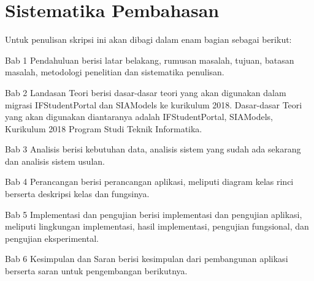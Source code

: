 \section{Sistematika Pembahasan}
\label{sec:sispem}
Untuk penulisan skripsi ini akan dibagi dalam enam bagian sebagai berikut:

Bab 1 Pendahuluan berisi latar belakang, rumusan masalah, tujuan, batasan masalah, metodologi penelitian dan sistematika penulisan.

Bab 2 Landasan Teori berisi dasar-dasar teori yang akan digunakan dalam migrasi IFStudentPortal dan SIAModels ke kurikulum 2018. Dasar-dasar Teori yang akan digunakan diantaranya adalah IFStudentPortal, SIAModels, Kurikulum 2018 Program Studi Teknik Informatika. 

Bab 3 Analisis berisi kebutuhan data, analisis sistem yang sudah ada sekarang dan analisis sistem usulan.

Bab 4 Perancangan berisi perancangan aplikasi, meliputi diagram kelas rinci berserta deskripsi kelas dan fungsinya.

Bab 5 Implementasi dan pengujian berisi implementasi dan pengujian aplikasi, meliputi lingkungan implementasi, hasil implementasi, pengujian fungsional, dan pengujian eksperimental.

Bab 6 Kesimpulan dan Saran berisi kesimpulan dari pembangunan aplikasi berserta saran untuk pengembangan berikutnya.